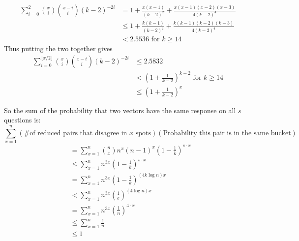 \documentclass[12pt, a4paper]{article}
\begin{document}
\begin{align*}
\sum_{i=0}^{2} \binom{x}{i}\binom{x-i}{i}(k-2)^{-2i} & = 1+\frac{x(x-1)}{(k-2)^2}+\frac{x(x-1)(x-2)(x-3)}{4(k-2)^4} \\
& \le 1+\frac{k(k-1)}{(k-2)^2}+\frac{k(k-1)(k-2)(k-3)}{4(k-2)^4} \\
& < 2.5536 \text{ for } k\ge 14
\end{align*}
Thus putting the two together gives
\begin{align*}
\sum_{i=0}^{\lfloor x/2 \rfloor} \binom{x}{i}\binom{x-i}{i}(k-2)^{-2i} & \le 2.5832 \\
& < \left(1+\frac{1}{k-2}\right)^{k-2} \text{ for } k\ge14\\
& \le \left(1+\frac{1}{k-2}\right)^{x}
\end{align*}

\clearpage
So the sum of the probability that two vectors have the same response on all $s$ questions is:
\begin{equation*}
\sum_{x=1}^n(\text{\# of reduced pairs that disagree in $x$ spots})(\text{Probability this pair is in the same bucket}) 
\end{equation*}
\begin{align*}
&=\sum_{x=1}^n \binom{n}{x}n^x(n-1)^x \left(1-\frac{1}{k}\right)^{s\cdot x} \\
&\le \sum_{x=1}^n n^{3x} \left(1-\frac{1}{k}\right)^{s\cdot x} \\
&= \sum_{x=1}^n n^{3x} \left(1-\frac{1}{k}\right)^{(4k\log n)x} \\
&< \sum_{x=1}^n n^{3x} \left(\frac{1}{e}\right)^{(4\log n)x} \\
&= \sum_{x=1}^n n^{3x} \left(\frac{1}{n}\right)^{4\cdot x} \\
&\le \sum_{x=1}^n \frac{1}{n} \\
&\le 1
\end{align*}
\end{document}

